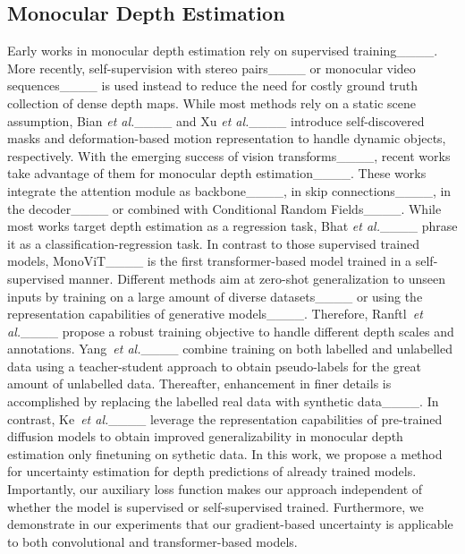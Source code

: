 \subsection{Monocular Depth Estimation}
Early works in monocular depth estimation rely on supervised training____. More recently, self-supervision with stereo pairs____ or monocular video sequences____ is used instead to reduce the need for costly ground truth collection of dense depth maps. 
While most methods rely on a static scene assumption, Bian \textit{et al.}____ and Xu \textit{et al.}____ introduce self-discovered masks and deformation-based motion representation to handle dynamic objects, respectively. With the emerging success of vision transforms____, recent works take advantage of them for monocular depth estimation____. These works integrate the attention module as backbone____, in skip connections____, in the decoder____ or combined with Conditional Random Fields____. While most works target depth estimation as a regression task, Bhat \textit{et al.}____ phrase it as a classification-regression task. 
In contrast to those supervised trained models, MonoViT____ is the first transformer-based model trained in a self-supervised manner. 
Different methods aim at zero-shot generalization to unseen inputs by training on a large amount of diverse datasets____ or using the representation capabilities of generative models____.
Therefore, Ranftl~\textit{et al.}____ propose a robust training objective to handle different depth scales and annotations.
Yang~\textit{et al.}____ combine training on both labelled and unlabelled data using a teacher-student approach to obtain pseudo-labels for the great amount of unlabelled data. Thereafter, enhancement in finer details is accomplished by replacing the labelled real data with synthetic data____.
In contrast, Ke~\textit{et al.}____ leverage the representation capabilities of pre-trained diffusion models to obtain improved generalizability in monocular depth estimation only finetuning on sythetic data.
In this work, we propose a method for uncertainty estimation for depth predictions of already trained models. Importantly, our auxiliary loss function makes our approach independent of whether the model is supervised or self-supervised trained. Furthermore, we demonstrate in our experiments that our gradient-based uncertainty is applicable to both convolutional and transformer-based models.